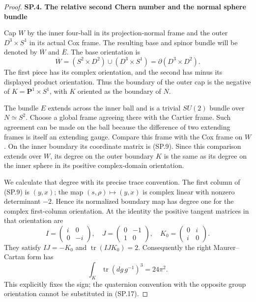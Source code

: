 \begin{proof}
\par

\medskip\noindent\textbf{SP.4. The relative second Chern number and the normal sphere bundle}

\par\nobreak

Cap \(W\) by the inner four-ball in its projection-normal frame
and the outer \(D^3\times S^1\) in its actual Cox frame. The
resulting base and spinor bundle will be denoted by
\(\overline W\) and \(\overline E\). The base orientation is
\[
 \overline W=(S^2\times D^2)\cup(D^3\times S^1)
                      =\partial(D^3\times D^2).
                                                               \tag{SP.15}
\]
The first piece has its complex orientation, and the second has
minus its displayed product orientation. Thus the boundary of the
outer cap is the negative of
\(K=\mathbf P^1\times S^1\), with \(K\) oriented as the
boundary of \(N\).

The bundle \(E\) extends across the inner ball and is a trivial
\(SU(2)\) bundle over \(N\simeq S^2\). Choose a global frame
agreeing there with the Cartier frame. Such agreement can be made
on the ball because the difference of two extending frames is
itself an extending gauge. Compare this frame with the Cox frame on
\(W\). On the inner boundary its coordinate matrix is (SP.9).
Since this comparison extends over \(W\), its degree on the outer
boundary \(K\) is the same as its degree on the inner sphere in
its positive complex-domain orientation.

We calculate that degree with its precise trace convention. The
first column of (SP.9) is \((y,x)\); the map
\((s,\rho)\mapsto(y,x)\) is complex linear with nonzero
determinant \(-2\). Hence its normalized boundary map has degree
one for the complex first-column orientation. At the identity the
positive tangent matrices in that orientation are
\[
 I=\begin{pmatrix}i&0\\0&-i\end{pmatrix},\quad
 J=\begin{pmatrix}0&-1\\1&0\end{pmatrix},\quad
 K_0=\begin{pmatrix}0&i\\i&0\end{pmatrix}.
                                                               \tag{SP.16}
\]
They satisfy \(IJ=-K_0\) and \(\operatorname{tr}(IJK_0)=2\).
Consequently the right Maurer--Cartan form has
\[
           \int_K\operatorname{tr}(dg\,g^{-1})^3=24\pi^2.
                                                               \tag{SP.17}
\]
This explicitly fixes the sign; the quaternion convention with the
opposite group orientation cannot be substituted in (SP.17).


\end{proof}
